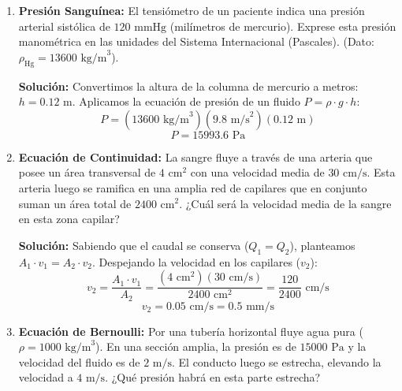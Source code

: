 \documentclass[12pt,letterpaper]{article}
\begin{document}
\begin{enumerate}
    \textbf{Solución:}
    El peso real del hombre es $W = m \cdot g = 70 \text{ kg} \cdot 9.8 \text{ m/s}^2 = 686 \text{ N}$.
    La fuerza de empuje ($E$) viene dada por $E = \rho_{\text{agua}} \cdot g \cdot V_{\text{sumergido}}$:
    \[
    E = (1000 \text{ kg/m}^3)(9.8 \text{ m/s}^2)(0.065 \text{ m}^3) = 637 \text{ N}
    \]
    El peso aparente será:
    \[
    W_{\text{aparente}} = W - E = 686 \text{ N} - 637 \text{ N} = 49 \text{ N}
    \]

    \vspace{0.3cm}
    \item \textbf{Presión Sanguínea:} El tensiómetro de un paciente indica una presión arterial sistólica de $120 \text{ mmHg}$ (milímetros de mercurio). Exprese esta presión manométrica en las unidades del Sistema Internacional (Pascales). (Dato: $\rho_{\text{Hg}} = 13600 \text{ kg/m}^3$).

    \textbf{Solución:}
    Convertimos la altura de la columna de mercurio a metros: $h = 0.12 \text{ m}$.
    Aplicamos la ecuación de presión de un fluido $P = \rho \cdot g \cdot h$:
    \[
    P = (13600 \text{ kg/m}^3)(9.8 \text{ m/s}^2)(0.12 \text{ m})
    \]
    \[
    P = 15993.6 \text{ Pa}
    \]

    \vspace{0.3cm}
    \item \textbf{Ecuación de Continuidad:} La sangre fluye a través de una arteria que posee un área transversal de $4 \text{ cm}^2$ con una velocidad media de $30 \text{ cm/s}$. Esta arteria luego se ramifica en una amplia red de capilares que en conjunto suman un área total de $2400 \text{ cm}^2$. ¿Cuál será la velocidad media de la sangre en esta zona capilar?

    \textbf{Solución:}
    Sabiendo que el caudal se conserva ($Q_1 = Q_2$), planteamos $A_1 \cdot v_1 = A_2 \cdot v_2$.
    Despejando la velocidad en los capilares ($v_2$):
    \[
    v_2 = \frac{A_1 \cdot v_1}{A_2} = \frac{(4 \text{ cm}^2)(30 \text{ cm/s})}{2400 \text{ cm}^2} = \frac{120}{2400} \text{ cm/s}
    \]
    \[
    v_2 = 0.05 \text{ cm/s} = 0.5 \text{ mm/s}
    \]

    \vspace{0.3cm}
    \item \textbf{Ecuación de Bernoulli:} Por una tubería horizontal fluye agua pura ($\rho = 1000 \text{ kg/m}^3$). En una sección amplia, la presión es de $15000 \text{ Pa}$ y la velocidad del fluido es de $2 \text{ m/s}$. El conducto luego se estrecha, elevando la velocidad a $4 \text{ m/s}$. ¿Qué presión habrá en esta parte estrecha?


\end{enumerate}
\end{document}

